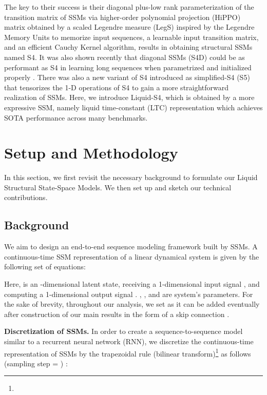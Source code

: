 \documentclass{MITcsail}
\begin{document}
The key to their success is their diagonal plus-low rank parameterization of the transition matrix of SSMs via higher-order polynomial projection (HiPPO) matrix \citep{gu2020hippo} obtained by a scaled Legendre measure (LegS) inspired by the Legendre Memory Units \citep{voelker2019legendre} to memorize input sequences, a learnable input transition matrix, and an efficient Cauchy Kernel algorithm, results in obtaining structural SSMs named S4. It was also shown recently that diagonal SSMs (S4D) \citep{gupta2022diagonal} could be as performant as S4 in learning long sequences when parametrized and initialized properly \citep{gu2022parameterization,gu2022train}. There was also a new variant of S4 introduced as simplified-S4 (S5) \cite{smith2022simplified} that tensorizes the 1-D operations of S4 to gain a more straightforward realization of SSMs. Here, we introduce Liquid-S4, which is obtained by a more expressive SSM, namely liquid time-constant (LTC) representation \citep{hasani2021liquid} which achieves SOTA performance across many benchmarks.

\section{Setup and Methodology}
In this section, we first revisit the necessary background to formulate our Liquid Structural State-Space Models. We then set up and sketch our technical contributions. 

\subsection{Background}
We aim to design an end-to-end sequence modeling framework built by SSMs. A continuous-time SSM representation of a linear dynamical system is given by the following set of equations: 

\begingroup
\small

\endgroup

Here,  is an -dimensional latent state, receiving a 1-dimensional input signal , and computing a 1-dimensional output signal . , ,  and  are system's parameters. For the sake of brevity, throughout our analysis, we set  as it can be added eventually after construction of our main results in the form of a skip connection \citep{gu2022efficiently}. 

\noindent \textbf{Discretization of SSMs.} In order to create a sequence-to-sequence model similar to a recurrent neural network (RNN), we discretize the continuous-time representation of SSMs by the trapezoidal rule (bilinear transform)\footnote{} as follows (sampling step = ) \citep{gu2022efficiently}:
\begingroup
\small
\end{document}

